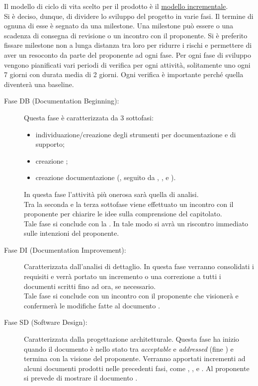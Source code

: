 		Il modello di ciclo di vita scelto per il prodotto è il \underline{modello incrementale}.\\Si è deciso, dunque, di dividere lo sviluppo del progetto in varie fasi. Il termine di ognuna di esse è segnato da una milestone. Una milestone può essere o una scadenza di consegna di revisione o un incontro con il proponente. Si è preferito fissare milestone non a lunga distanza tra loro per ridurre i rischi e permettere di aver un resoconto da parte del proponente ad ogni fase. Per ogni fase di sviluppo vengono pianificati vari periodi di verifica per ogni attività, solitamente uno ogni 7 giorni con durata media di 2 giorni. Ogni verifica è importante perché quella diventerà una baseline.
		\begin{description}
			\item[Fase DB (Documentation Beginning):] Questa fase è caratterizzata da 3 sottofasi:
				\begin{itemize}
					\item individuazione/creazione degli strumenti per documentazione e di supporto;
					\item creazione ;
					\item creazione documentazione (, seguito da , ,  e ).
				\end{itemize}
				In questa fase l'attività più onerosa sarà quella di analisi.\\Tra la seconda e la terza sottofase viene effettuato un incontro con il proponente per chiarire le idee sulla comprensione del capitolato.\\Tale fase si conclude con la . In tale modo si avrà un riscontro immediato sulle intenzioni del proponente.
			\item[Fase DI (Documentation Improvement):] Caratterizzata dall’analisi di dettaglio. In questa fase verranno consolidati i requisiti  e verrà portato un incremento o una correzione a tutti i documenti scritti fino ad ora, se necessario.\\Tale fase si conclude con un incontro con il proponente che visionerà e confermerà le modifiche fatte al documento .
			\item[Fase SD (Software Design):] Caratterizzata dalla progettazione architetturale. Questa fase ha inizio quando il documento  è nello stato tra \textit{acceptable} e \textit{addressed} (fine ) e termina con la visione del proponente. Verranno apportati incrementi ad alcuni documenti prodotti nelle precedenti fasi, come , ,  e . Al proponente si prevede di mostrare il documento .

\end{description}
